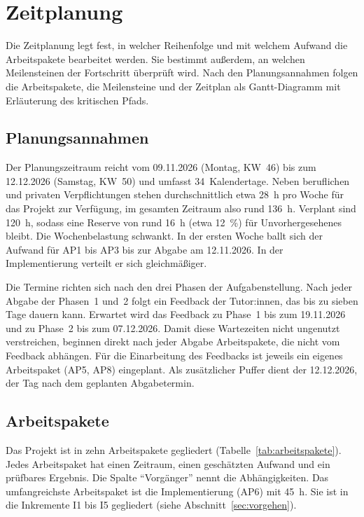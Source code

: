\section{Zeitplanung}
Die Zeitplanung legt fest, in welcher Reihenfolge und mit welchem Aufwand die Arbeitspakete bearbeitet werden. Sie bestimmt außerdem, an welchen Meilensteinen der Fortschritt überprüft wird. Nach den Planungsannahmen folgen die Arbeitspakete, die Meilensteine und der Zeitplan als Gantt-Diagramm mit Erläuterung des kritischen Pfads.

\subsection{Planungsannahmen}
Der Planungszeitraum reicht vom 09.11.2026 (Montag, \ac{KW}~46) bis zum 12.12.2026 (Samstag, \ac{KW}~50) und umfasst 34~Kalendertage. Neben beruflichen und privaten Verpflichtungen stehen durchschnittlich etwa 28~h pro Woche für das Projekt zur Verfügung, im gesamten Zeitraum also rund 136~h. Verplant sind 120~h, sodass eine Reserve von rund 16~h (etwa 12~\%) für Unvorhergesehenes bleibt. Die Wochenbelastung schwankt. In der ersten Woche ballt sich der Aufwand für AP1 bis AP3 bis zur Abgabe am 12.11.2026. In der Implementierung verteilt er sich gleichmäßiger.

Die Termine richten sich nach den drei Phasen der Aufgabenstellung. Nach jeder Abgabe der Phasen~1 und~2 folgt ein Feedback der Tutor:innen, das bis zu sieben Tage dauern kann. Erwartet wird das Feedback zu Phase~1 bis zum 19.11.2026 und zu Phase~2 bis zum 07.12.2026. Damit diese Wartezeiten nicht ungenutzt verstreichen, beginnen direkt nach jeder Abgabe Arbeitspakete, die nicht vom Feedback abhängen. Für die Einarbeitung des Feedbacks ist jeweils ein eigenes Arbeitspaket (AP5, AP8) eingeplant. Als zusätzlicher Puffer dient der 12.12.2026, der Tag nach dem geplanten Abgabetermin.

\subsection{Arbeitspakete}
Das Projekt ist in zehn Arbeitspakete gegliedert (Tabelle~\ref{tab:arbeitspakete}). Jedes Arbeitspaket hat einen Zeitraum, einen geschätzten Aufwand und ein prüfbares Ergebnis. Die Spalte \enquote{Vorgänger} nennt die Abhängigkeiten. Das umfangreichste Arbeitspaket ist die Implementierung (AP6) mit 45~h. Sie ist in die Inkremente I1 bis I5 gegliedert (siehe Abschnitt~\ref{sec:vorgehen}).

